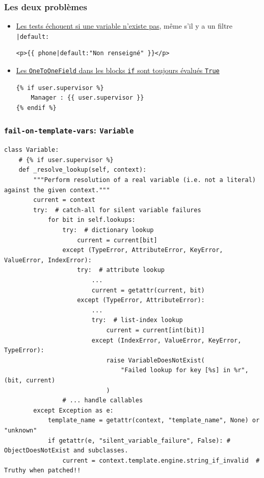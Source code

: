 \documentclass{beamer}
\begin{document}
\begin{frame}[fragile]
    \frametitle{Les deux problèmes}
    \begin{itemize}
        \item \href{https://github.com/pytest-dev/pytest-django/issues/471}{Les tests échouent si une variable n'existe pas}, même s'il y a un filtre \texttt{|default:}
\begin{verbatim}
<p>{{ phone|default:"Non renseigné" }}</p>
\end{verbatim}
        \item \href{https://github.com/pytest-dev/pytest-django/pull/1130}{Les \texttt{OneToOneField} dans les blocks \texttt{if} sont toujours évalués \texttt{True}}
\begin{verbatim}
{% if user.supervisor %}
    Manager : {{ user.supervisor }}
{% endif %}
\end{verbatim}
    \end{itemize}
\end{frame}

\begin{frame}[fragile]
    \frametitle{\texttt{fail-on-template-vars}: \texttt{Variable}}
    \vspace{-0.3cm}

    \begin{verbatim}
class Variable:
    # {% if user.supervisor %}
    def _resolve_lookup(self, context):
        """Perform resolution of a real variable (i.e. not a literal) against the given context."""
        current = context
        try:  # catch-all for silent variable failures
            for bit in self.lookups:
                try:  # dictionary lookup
                    current = current[bit]
                except (TypeError, AttributeError, KeyError, ValueError, IndexError):
                    try:  # attribute lookup
                        ...
                        current = getattr(current, bit)
                    except (TypeError, AttributeError):
                        ...
                        try:  # list-index lookup
                            current = current[int(bit)]
                        except (IndexError, ValueError, KeyError, TypeError):
                            raise VariableDoesNotExist(
                                "Failed lookup for key [%s] in %r", (bit, current)
                            )
                # ... handle callables
        except Exception as e:
            template_name = getattr(context, "template_name", None) or "unknown"
            if getattr(e, "silent_variable_failure", False): # ObjectDoesNotExist and subclasses.
                current = context.template.engine.string_if_invalid  # Truthy when patched!!
    \end{verbatim}
\end{frame}
\end{document}
